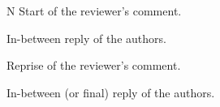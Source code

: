 %
%
\begin{ReviewerComment}{N}
Start of the reviewer's comment.
\end{ReviewerComment}
%
\begin{AnswerInBetween}
In-between reply of the authors.
 \HardRevTask
\end{AnswerInBetween}
%
%
\begin{ReviewerCommentReprise}
Reprise of the reviewer's comment.
\end{ReviewerCommentReprise}
%
\begin{AnswerInBetween}
In-between (or final) reply of the authors.
 \RevTaskDone
\end{AnswerInBetween}
\\
\NotEstimatedRevTask \EasyRevTask \MediumRevTask \TimeConsumingRevTask \HardRevTask \DeathRevTask 
\\
\WorkInProgressRevTask \AlmostDoneRevTask \RevTaskDone
